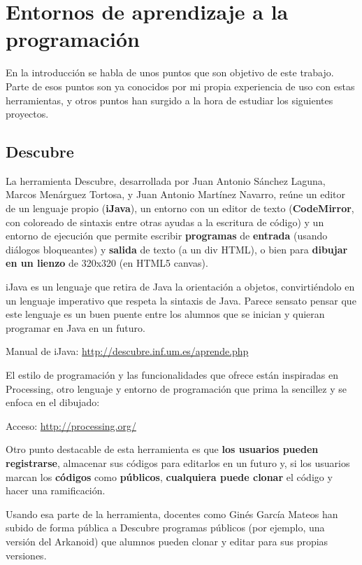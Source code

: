 \documentclass{report}
\begin{document}
	\section{Entornos de aprendizaje a la programación}
	
	En la introducción se habla de unos puntos que son objetivo de este trabajo. Parte de esos puntos son ya conocidos por mi propia experiencia de uso con estas herramientas, y otros puntos han surgido a la hora de estudiar los siguientes proyectos.
	
	\subsection{Descubre}
	
	\label{descubre}
	
	La herramienta Descubre, desarrollada por Juan Antonio Sánchez Laguna, Marcos Menárguez Tortosa, y Juan Antonio Martínez Navarro, reúne un editor de un lenguaje propio (\textbf{iJava}), un entorno con un editor de texto (\textbf{CodeMirror}, con coloreado de sintaxis entre otras ayudas a la escritura de código) y un entorno de ejecución que permite escribir \textbf{programas} de \textbf{entrada} (usando diálogos bloqueantes) y \textbf{salida} de texto (a un div HTML), o bien para \textbf{dibujar en un lienzo} de 320x320 (en HTML5 canvas).
	
	iJava es un lenguaje que retira de Java la orientación a objetos, convirtiéndolo en un lenguaje imperativo que respeta la sintaxis de Java. Parece 
	sensato pensar que este lenguaje es un buen puente entre los alumnos que se inician y quieran programar en Java en un futuro.
	
	Manual de iJava: \url{http://descubre.inf.um.es/aprende.php}
	
	El estilo de programación y las funcionalidades que ofrece están inspiradas en Processing, otro lenguaje y entorno de programación que prima la sencillez y se enfoca en el dibujado:
	
	Acceso: \href{http://processing.org/}{http://processing.org/}
	
	Otro punto destacable de esta herramienta es que \textbf{los usuarios pueden registrarse}, almacenar sus códigos para editarlos en un futuro y, si los usuarios marcan los \textbf{códigos} como \textbf{públicos}, \textbf{cualquiera puede clonar} el código y hacer una ramificación. 
	
	Usando esa parte de la herramienta, docentes como Ginés García Mateos han subido de forma pública a Descubre programas públicos (por ejemplo, una versión del Arkanoid) que alumnos pueden clonar y editar para sus propias versiones.
	
\end{document}
